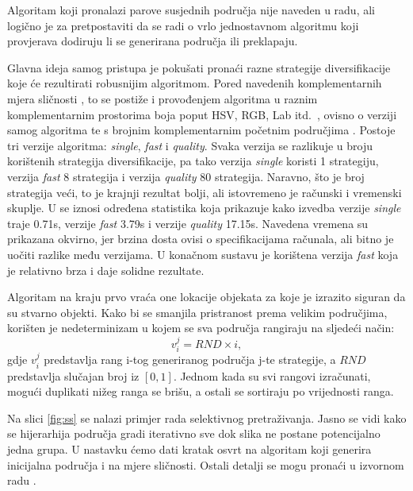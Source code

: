 \documentclass[times, utf8, diplomski]{fer}
\begin{document}
Algoritam koji pronalazi parove susjednih područja nije naveden u radu, ali logično je za pretpostaviti da se radi o vrlo jednostavnom algoritmu koji provjerava dodiruju li se generirana područja ili preklapaju.

Glavna ideja samog pristupa je pokušati pronaći razne strategije diversifikacije  koje će rezultirati robusnijim algoritmom. Pored navedenih komplementarnih mjera sličnosti , to se postiže i provođenjem algoritma u raznim komplementarnim prostorima boja  poput HSV, RGB, Lab itd.\ , ovisno o verziji samog algoritma te s brojnim komplementarnim početnim područjima . Postoje tri verzije algoritma: \textit{single}, \textit{fast} i \textit{quality}. Svaka verzija se razlikuje u broju korištenih strategija diversifikacije, pa tako verzija \textit{single} koristi 1 strategiju, verzija \textit{fast} 8 strategija i verzija \textit{quality} 80 strategija. Naravno, što je broj strategija veći, to je krajnji rezultat bolji, ali istovremeno je računski i vremenski skuplje. U \citep{ss-paper} se iznosi određena statistika koja prikazuje kako izvedba verzije \textit{single} traje 0.71s, verzije \textit{fast} 3.79s i verzije \textit{quality} 17.15s. Navedena vremena su prikazana okvirno, jer brzina dosta ovisi o specifikacijama računala, ali bitno je uočiti razlike među verzijama. U konačnom sustavu je korištena verzija \textit{fast} koja je relativno brza i daje solidne rezultate.

Algoritam na kraju prvo vraća one lokacije objekata za koje je izrazito siguran da su stvarno objekti. Kako bi se smanjila pristranost  prema velikim područjima, korišten je nedeterminizam u kojem se sva područja rangiraju na sljedeći način:
\begin{equation}
    v_i^j = RND \times i,    
\end{equation}
gdje $v_i^j$ predstavlja rang i-tog generiranog područja j-te strategije, a $RND$ predstavlja slučajan broj iz $[0,1]$. Jednom kada su svi rangovi izračunati, mogući duplikati nižeg ranga se brišu, a ostali se sortiraju po vrijednosti ranga. 

Na slici \ref{fig:ss} se nalazi primjer rada selektivnog pretraživanja. Jasno se vidi kako se hijerarhija područja gradi iterativno sve dok slika ne postane potencijalno jedna grupa. U nastavku ćemo dati kratak osvrt na algoritam koji generira inicijalna područja i na mjere sličnosti. Ostali detalji se mogu pronaći u izvornom radu \citep{ss-paper}.
\end{document}
